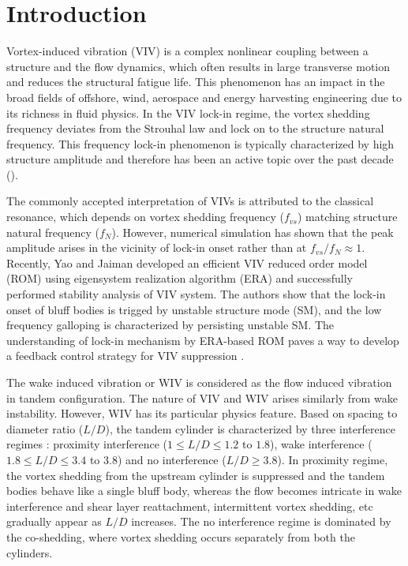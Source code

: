 \section{Introduction}
\label{intro}

Vortex-induced vibration (VIV) is a complex nonlinear coupling between a structure and the flow dynamics, which 
often results in large transverse motion and reduces the structural fatigue life. 
This phenomenon has an impact in the broad fields of offshore, wind, aerospace and energy harvesting engineering due to 
its richness in fluid physics. In the VIV lock-in regime, the vortex shedding frequency deviates from the Strouhal
law and lock on to the structure natural frequency. This frequency lock-in phenomenon is typically characterized by 
high structure amplitude and therefore has been an active topic over the past decade (\cite{sarpkaya2004,Williamson2004,bearman2011}). 

The commonly accepted interpretation of VIVs is attributed to the classical resonance, which depends on 
vortex shedding frequency ($f_{vs}$) matching structure natural frequency ($f_N$). However, numerical simulation has shown that 
the peak amplitude arises in the vicinity of lock-in onset rather than at $f_{vs}/f_N \approx 1$. Recently, Yao and Jaiman \cite{yao_jfm_1} 
developed an efficient VIV reduced order model (ROM) using eigensystem realization algorithm (ERA) and successfully performed
stability analysis of VIV system. 
The authors show that the lock-in onset of bluff bodies is trigged by unstable structure mode (SM), and 
the low frequency galloping is characterized by persisting unstable SM. 
The understanding of lock-in mechanism by ERA-based ROM 
paves a way to develop a feedback control strategy for VIV suppression \cite{yao_jfm_2}. 


The wake induced vibration or WIV is considered as the flow induced vibration in tandem 
configuration. The nature of VIV and WIV arises similarly from wake instability. However, WIV has its particular physics 
feature. Based on spacing to diameter ratio ($L/D$), the tandem cylinder is characterized by 
three interference regimes \cite{Mysa2016,ZDRAVKOVICH1987239,1981323}: proximity interference ($1 \le L/D \le 1.2$ to $1.8$), 
wake interference ($1.8 \le L/D \le 3.4$ to $3.8$) and no interference ($L/D \ge 3.8$).
In proximity regime, the vortex shedding
from the upstream cylinder is suppressed and the tandem bodies behave like a single bluff body, whereas the flow becomes intricate 
in wake interference and shear layer reattachment, intermittent vortex shedding, etc gradually appear as $L/D$ increases. 
The no interference regime is dominated by the co-shedding, where vortex shedding occurs separately from both the cylinders.

